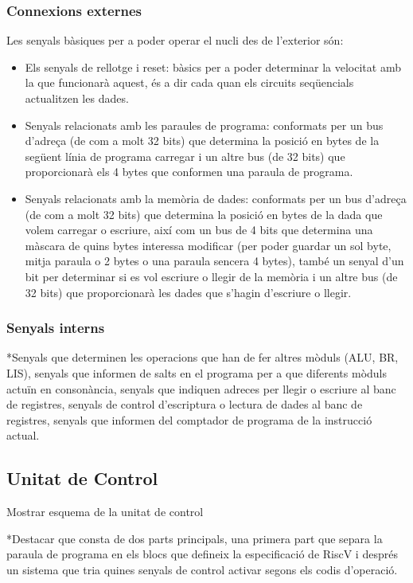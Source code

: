 \documentclass[10pt,a4paper,twocolumn,twoside]{article}
\begin{document}
        \subsubsection{Connexions externes}
        Les senyals bàsiques per a poder operar el nucli des de l'exterior són:
        \begin{itemize}
            \item Els senyals de rellotge i reset: bàsics per a poder determinar la velocitat amb la que funcionarà aquest, és a dir cada quan els circuits seqüencials actualitzen les dades.
            \item Senyals relacionats amb les paraules de programa: conformats per un bus d'adreça (de com a molt 32 bits) que determina la posició en bytes de la següent línia de programa carregar i un altre bus (de 32 bits) que proporcionarà els 4 bytes que conformen una paraula de programa.
            \item Senyals relacionats amb la memòria de dades: conformats per un bus d'adreça (de com a molt 32 bits) que determina la posició en bytes de la dada que volem carregar o escriure, així com un bus de 4 bits que determina una màscara de quins bytes interessa modificar (per poder guardar un sol byte, mitja paraula o 2 bytes o una paraula sencera 4 bytes), també un senyal d'un bit per determinar si es vol escriure o llegir de la memòria i un altre bus (de 32 bits) que proporcionarà les dades que s'hagin d'escriure o llegir.
        \end{itemize}
        
        \subsubsection{Senyals interns}
        
        *Senyals que determinen les operacions que han de fer altres mòduls (ALU, BR, LIS), senyals que informen de salts en el programa per a que diferents mòduls actuïn en consonància, senyals que indiquen adreces per llegir o escriure al banc de registres, senyals de control d'escriptura o lectura de dades al banc de registres, senyals que informen del comptador de programa de la instrucció actual.
    
    \subsection{Unitat de Control}
    Mostrar esquema de la unitat de control 
    
    *Destacar que consta de dos parts principals, una primera part que separa la paraula de programa en els blocs que defineix la especificació de RiscV i després un sistema que tria quines senyals de control activar segons els codis d'operació.
    
\end{document}
